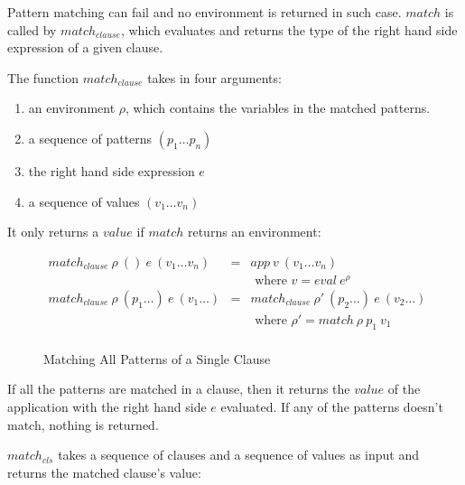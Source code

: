 Pattern matching can fail and no environment is returned in such case. $match$ is called by $match_{clause}$, which evaluates and returns the type of the right hand side expression of a given clause.

The function $match_{clause}$ takes in four arguments:

\begin{enumerate}
  \item an environment $\rho$, which contains the variables in the matched patterns.
  \item a sequence of patterns $(p_1 \dots p_n)$
  \item the right hand side expression $e$
  \item a sequence of values $(v_1 \dots v_n)$
\end{enumerate}

It only returns a $value$ if $match$ returns an environment:

\begin{figure}[H]
  \begin{equation*}
    \begin{aligned}
      match_{clause} \: \rho \: () \: e \: (v_1 \dots v_n)      & = & app \: v \: (v_1 \dots v_n)                                \\
                                                                &   & \textrm{ where } v = eval \: e^{\rho}                      \\
      match_{clause} \: \rho \: (p_1 \dots) \: e \: (v_1 \dots) & = & match_{clause} \: \rho' \: (p_2 \dots) \: e \: (v_2 \dots) \\
                                                                &   & \textrm{ where } \rho' = match \: \rho \: p_1 \: v_1       \\
    \end{aligned}
  \end{equation*}
  \caption{Matching All Patterns of a Single Clause}
\end{figure}

If all the patterns are matched in a clause, then it returns the $value$ of the application with the right hand side $e$ evaluated. If any of the patterns doesn't match, nothing is returned.

$match_{cls}$ takes a sequence of clauses and a sequence of values as input and returns the matched clause's value:

